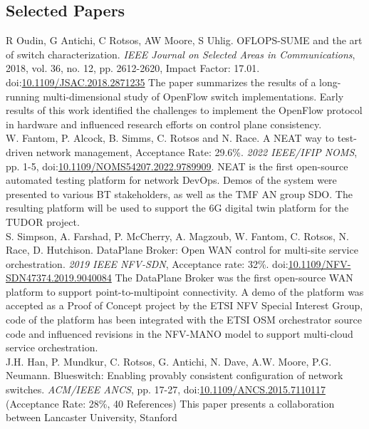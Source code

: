 \documentclass[10pt, a4paper]{article}
\newcommand{\DOI}[1]{doi:\href{https://doi.org/#1}{#1}}
\begin{document}
\subsection{Selected Papers}
\begin{EntriesList}

    R Oudin, G Antichi, C Rotsos, AW Moore, S Uhlig.
    OFLOPS-SUME and the art of switch characterization.
\emph{IEEE Journal on Selected Areas in Communications}, 2018, vol. 36, no. 12, pp.
2612-2620, Impact Factor: 17.01.  \DOI{10.1109/JSAC.2018.2871235} \newline
The paper summarizes the results of a long-running multi-dimensional study of
OpenFlow switch implementations. Early results of this work identified
the challenges to implement the OpenFlow protocol in hardware and influenced
research efforts on control plane consistency.
    \\
W. Fantom, P. Alcock, B. Simms, C. Rotsos and N. Race. A NEAT way to
test-driven network management, Acceptance Rate: 29.6\%. \emph{2022 IEEE/IFIP NOMS},
pp. 1-5, \DOI{10.1109/NOMS54207.2022.9789909}. \newline
NEAT is the first open-source automated testing platform for network DevOps.
Demos of the system were presented to various BT stakeholders,
as well as  the TMF AN group SDO. The resulting platform will be used to support
the 6G digital twin platform for the TUDOR project.
\\
    S. Simpson, A. Farshad, P. McCherry, A. Magzoub, W. Fantom, C. Rotsos,
    N. Race, D. Hutchison.
    DataPlane Broker: Open WAN control for multi-site service orchestration.
\emph{2019 IEEE NFV-SDN}, Acceptance rate: 32\%.
\DOI{10.1109/NFV-SDN47374.2019.9040084} \newline
The DataPlane Broker was the first open-source WAN platform to support
point-to-multipoint connectivity. A demo of the platform was accepted as a Proof
of Concept project by the ETSI NFV Special Interest Group, code of the platform
has been integrated with the ETSI OSM orchestrator source code and influenced
revisions in the NFV-MANO model to support multi-cloud service orchestration. 
    \\
     J.H. Han, P. Mundkur, C. Rotsos, G. Antichi, N. Dave, A.W. Moore, P.G.  Neumann.
     Blueswitch: Enabling provably consistent configuration of network switches.
\emph{ACM/IEEE ANCS}, pp. 17-27, \DOI{10.1109/ANCS.2015.7110117} (Acceptance
Rate: 28\%, 40 References) \newline
This paper presents a collaboration between Lancaster University, Stanford

\end{EntriesList}
\end{document}
